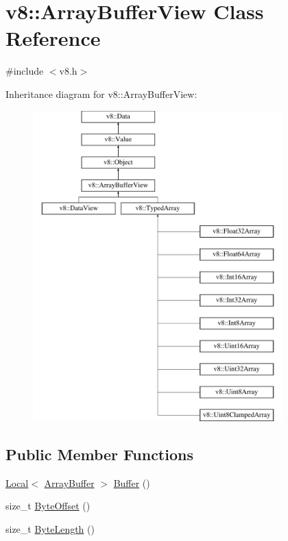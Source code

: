 \hypertarget{classv8_1_1ArrayBufferView}{}\section{v8\+:\+:Array\+Buffer\+View Class Reference}
\label{classv8_1_1ArrayBufferView}


{\ttfamily \#include $<$v8.\+h$>$}

Inheritance diagram for v8\+:\+:Array\+Buffer\+View\+:\begin{figure}[H]
\begin{center}
\leavevmode
\includegraphics[height=12.000000cm]{classv8_1_1ArrayBufferView}
\end{center}
\end{figure}
\subsection*{Public Member Functions}
\begin{DoxyCompactItemize}
\item 
\hyperlink{classv8_1_1Local}{Local}$<$ \hyperlink{classv8_1_1ArrayBuffer}{Array\+Buffer} $>$ \hyperlink{classv8_1_1ArrayBufferView_a2ceba3908fbf98ecc81702083127b046}{Buffer} ()
\item 
size\+\_\+t \hyperlink{classv8_1_1ArrayBufferView_a4739a31269f5ebc5b88a708b9429c688}{Byte\+Offset} ()
\item 
size\+\_\+t \hyperlink{classv8_1_1ArrayBufferView_a9fc7563c97e0b639a6c0a3274995bb3c}{Byte\+Length} ()
\end{DoxyCompactItemize}
